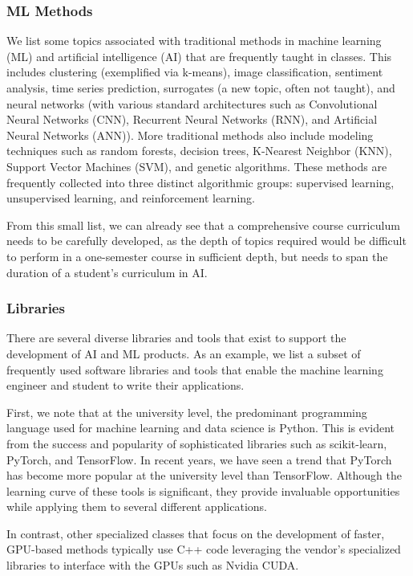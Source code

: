 \documentclass[utf8]{FrontiersinVancouver} %
\begin{document}
\subsubsection{ML Methods}

We list some topics associated with traditional methods in machine learning (ML) and artificial intelligence (AI) that are frequently taught in classes. This includes clustering (exemplified via k-means), image classification, sentiment analysis, time series prediction, surrogates (a new topic, often not taught), and neural networks (with various standard architectures such as Convolutional Neural Networks (CNN), Recurrent Neural Networks (RNN), and Artificial Neural Networks (ANN)). More traditional methods also include modeling techniques such as random forests, decision trees, K-Nearest Neighbor (KNN), Support Vector Machines (SVM), and genetic algorithms. These methods are frequently collected into three distinct algorithmic groups: supervised learning, unsupervised learning, and reinforcement learning.

From this small list, we can already see that a comprehensive course curriculum needs to be carefully developed, as the depth of topics required would be difficult to perform in a one-semester course in sufficient depth, but needs to span the duration of a student's curriculum in AI.

\subsubsection{Libraries}

There are several diverse libraries and tools that exist to support the development of AI and ML products. As an example, we list a subset of frequently used software libraries and tools that enable the machine learning engineer and student to write their applications.

First, we note that at the university level, the predominant programming language used for machine learning and data science is Python. This is evident from the success and popularity of sophisticated libraries such as scikit-learn, PyTorch, and TensorFlow. In recent years, we have seen a trend that PyTorch has become more popular at the university level than TensorFlow. Although the learning curve of these tools is significant, they provide invaluable opportunities while applying them to several different applications.

In contrast, other specialized classes that focus on the development of faster, GPU-based methods typically use C++ code leveraging the vendor's specialized libraries to interface with the GPUs such as Nvidia CUDA.
\end{document}
